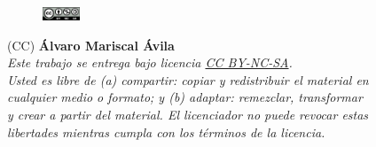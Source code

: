 
\vspace{5cm}

\begin{flushright}

	\begin{figure}
		\includegraphics[width=0.10\textwidth,right]{figs/by-nc-sa.png}
	\end{figure}

	\vspace{0.2cm}

	{\tiny
		(CC) \textbf{Álvaro Mariscal Ávila}\\
		\vspace{0.5cm}
		\emph{
			Este trabajo se entrega bajo licencia \href{https://creativecommons.org/licenses/by-nc-sa/3.0/es/}{CC BY-NC-SA}. \\
			Usted es libre de \textit{(a) compartir}: copiar y redistribuir el material en \\
			cualquier medio o formato; y \textit{(b) adaptar}: remezclar, transformar \\
			y crear a partir del material. El licenciador no puede revocar estas \\
			libertades mientras cumpla con los términos de la licencia. \\}
	}

\end{flushright}